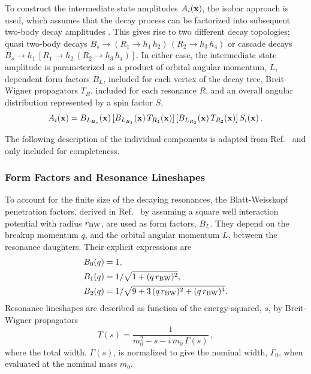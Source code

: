 To construct the intermediate state amplitudes $A_{i}(\mathbf{x} )$,
the isobar approach is used, which 
assumes that
the decay process can be factorized into subsequent two-body decay amplitudes \cite{isobar1,isobar,isobar2}.
This gives rise to two different decay topologies;
quasi two-body decays
$B_s \to (R_{1} \to h_{1}\,h_{2}) \, (R_{2} \to h_{3}\,h_{4})$ 
or cascade decays
$B_s \to h_{1} \, \left[R_{1} \to h_{2} \,  (R_{2} \to h_{3} \, h_{4}) \right]$.
In either case, the intermediate state amplitude is parameterized as a product of
orbital angular momentum, $L$, dependent 
form factors $B_{L}$, included for each vertex of the decay tree, 
Breit-Wigner propagators $T_{R}$,  included for each resonance $R$,
and an overall angular distribution represented by a spin factor $S$,
\begin{equation}
	A_{i}(\mathbf{x} ) =  B_{L_{B_s}}(\bold x) \, [B_{L_{R_{1}}}(\mathbf{x} )  \, T_{R_{1}}(\mathbf{x} )] \, [B_{L_{R_{2}}}(\mathbf{x} ) \, T_{R_{2}}(\mathbf{x} )]  \,  S_{i}(\mathbf{x} )  \, .
	\label{eq:amp4}
\end{equation}

The following description of the individual components is adapted from Ref.~\cite{dArgent:2017gzv} 
and only included for completeness.

\subsubsection{Form Factors and Resonance Lineshapes}
\label{ssec:lineshapes}

To account for the finite size of the decaying resonances,
the Blatt-Weisskopf penetration factors, 
derived in Ref.~\cite{Bl2}
by assuming a square well interaction potential with radius $r_{\rm BW}$,
are used as form factors, $B_L$.
They depend on
the breakup momentum $q$,
and the orbital angular momentum $L$, between the resonance daughters.
Their explicit expressions are
\begin{align}
         \nonumber
	B_{0}(q)  &= 1 ,  \\ \nonumber
	B_{1}(q)  &= 1 / \sqrt{{1+ (q \, r_{\rm BW})^{2}}} ,  \\
	B_{2}(q)  &= 1 / \sqrt{9+3\,(q \, r_{\rm BW})^{2}+(q \, r_{\rm BW})^{4}} . 
\end{align}
Resonance lineshapes
are described as function of the energy-squared, $s$, by Breit-Wigner propagators
\begin{equation}
	T(s) = \frac{1}
	{m_0^{2} - s - i\,m_{0}\,\Gamma(s)}   \, ,
	\label{eq:BW}
\end{equation}
where the total width, $\Gamma(s)$, is normalized to give the nominal width, $\Gamma_{0}$, when evaluated at the nominal mass $m_{0}$.

